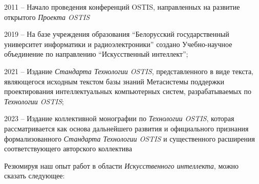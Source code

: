 \begin{textitemize}
\item 2011 -- Начало проведения  конференций OSTIS, направленных на развитие открытого \textit{Проекта OSTIS}
\item 2019 -- На базе учреждения образования ``Белорусский государственный университет информатики и радиоэлектроники'' создано Учебно-научное объединение по направлению ``Искусственный интеллект'';
\item 2021 -- Издание  \textit{Стандарта Технологии OSTIS}, представленного в виде  текста, являющегося исходным текстом базы знаний Метасистемы поддержки проектирования интеллектуальных компьютерных систем, разрабатываемых по \textit{Технологии OSTIS};
\item 2023 -- Издание коллективной монографии по \textit{Технологии OSTIS}, которая рассматривается как основа дальнейшего развития и официального признания формализованного \textit{Стандарта Технологии OSTIS} и существенного расширения соответствующего авторского коллектива
\end{textitemize}

Резюмируя наш опыт работ в области \textit{Искусственного интеллекта}, можно сказать следующее:

